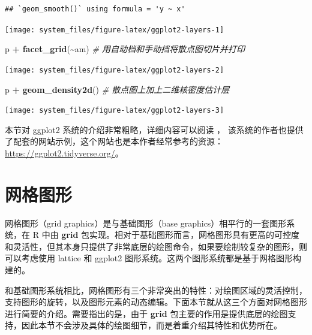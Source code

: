 \documentclass[
  b5paper,
  UTF8,twoside]{book}
\newenvironment{Shaded}{\begin{snugshade}}{\end{snugshade}}
\newcommand{\CommentTok}[1]{\textcolor[rgb]{0.56,0.35,0.01}{\textit{#1}}}
\newcommand{\FunctionTok}[1]{\textcolor[rgb]{0.13,0.29,0.53}{\textbf{#1}}}
\newcommand{\NormalTok}[1]{#1}
\newcommand{\SpecialCharTok}[1]{\textcolor[rgb]{0.81,0.36,0.00}{\textbf{#1}}}
\begin{document}
\begin{verbatim}
## `geom_smooth()` using formula = 'y ~ x'
\end{verbatim}

\begin{center}\texttt{[image: system\_files/figure-latex/ggplot2-layers-1]} \end{center}

\begin{Shaded}
\begin{Highlighting}[]
\NormalTok{p }\SpecialCharTok{+} \FunctionTok{facet\_grid}\NormalTok{(}\SpecialCharTok{\textasciitilde{}}\NormalTok{am) }\CommentTok{\# 用自动档和手动挡将散点图切片并打印}
\end{Highlighting}
\end{Shaded}

\begin{center}\texttt{[image: system\_files/figure-latex/ggplot2-layers-2]} \end{center}

\begin{Shaded}
\begin{Highlighting}[]
\NormalTok{p }\SpecialCharTok{+} \FunctionTok{geom\_density2d}\NormalTok{() }\CommentTok{\# 散点图上加上二维核密度估计层}
\end{Highlighting}
\end{Shaded}

\begin{center}\texttt{[image: system\_files/figure-latex/ggplot2-layers-3]} \end{center}

本节对 ggplot2 系统的介绍非常粗略，详细内容可以阅读 \citet{ggplot2}， 该系统的作者也提供了配套的网站示例，这个网站也是本作者经常参考的资源：\url{https://ggplot2.tidyverse.org/}。

\section{网格图形}\label{ux7f51ux683cux56feux5f62}

网格图形（grid graphics）是与基础图形（base graphics）相平行的一套图形系统，在 R 中由 \textbf{grid} 包实现。相对于基础图形而言，网格图形具有更高的可控度和灵活性，但其本身只提供了非常底层的绘图命令，如果要绘制较复杂的图形，则可以考虑使用 lattice 和 ggplot2 图形系统。这两个图形系统都是基于网格图形构建的。

和基础图形系统相比，网格图形有三个非常突出的特性：对绘图区域的灵活控制，支持图形的旋转，以及图形元素的动态编辑。下面本节就从这三个方面对网格图形进行简要的介绍。需要指出的是，由于 \textbf{grid} 包主要的作用是提供底层的绘图支持，因此本节不会涉及具体的绘图细节，而是着重介绍其特性和优势所在。
\end{document}
